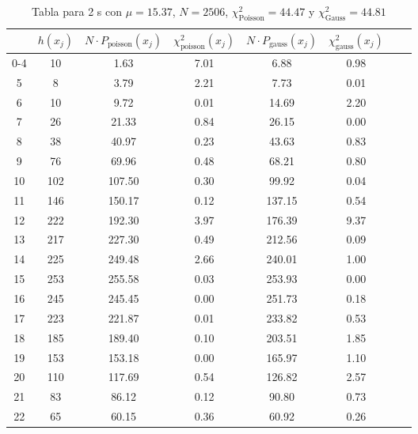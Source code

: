 \begin{center}
\begin{table}[H]
\caption{Tabla para 2 s con $\mu=15.37$, $N=2506$, $\chi^2_{\text{Poisson}}=44.47$  y $\chi^2_{\text{Gauss}}=44.81$}
\label{Tab:histo__2s}
\begin{tabular}{cccccccc}
\toprule
 & $h(x_j)$ & $N \cdot P_{\text{poisson}} (x_j)$ & $\chi^2_{\text{poisson}}(x_j)$ & $N \cdot P_{\text{gauss}} (x_j)$ & $\chi^2_{\text{gauss}}(x_j)$ \\
\midrule
0-4 & \num{   10} & \num{1.63} & \num{7.01} & \num{6.88} & \num{0.98} \\
5 & \num{    8} & \num{3.79} & \num{2.21} & \num{7.73} & \num{0.01} \\
6 & \num{   10} & \num{9.72} & \num{0.01} & \num{14.69} & \num{2.20} \\
7 & \num{   26} & \num{21.33} & \num{0.84} & \num{26.15} & \num{0.00} \\
8 & \num{   38} & \num{40.97} & \num{0.23} & \num{43.63} & \num{0.83} \\
9 & \num{   76} & \num{69.96} & \num{0.48} & \num{68.21} & \num{0.80} \\
10 & \num{  102} & \num{107.50} & \num{0.30} & \num{99.92} & \num{0.04} \\
11 & \num{  146} & \num{150.17} & \num{0.12} & \num{137.15} & \num{0.54} \\
12 & \num{  222} & \num{192.30} & \num{3.97} & \num{176.39} & \num{9.37} \\
13 & \num{  217} & \num{227.30} & \num{0.49} & \num{212.56} & \num{0.09} \\
14 & \num{  225} & \num{249.48} & \num{2.66} & \num{240.01} & \num{1.00} \\
15 & \num{  253} & \num{255.58} & \num{0.03} & \num{253.93} & \num{0.00} \\
16 & \num{  245} & \num{245.45} & \num{0.00} & \num{251.73} & \num{0.18} \\
17 & \num{  223} & \num{221.87} & \num{0.01} & \num{233.82} & \num{0.53} \\
18 & \num{  185} & \num{189.40} & \num{0.10} & \num{203.51} & \num{1.85} \\
19 & \num{  153} & \num{153.18} & \num{0.00} & \num{165.97} & \num{1.10} \\
20 & \num{  110} & \num{117.69} & \num{0.54} & \num{126.82} & \num{2.57} \\
21 & \num{   83} & \num{86.12} & \num{0.12} & \num{90.80} & \num{0.73} \\
22 & \num{   65} & \num{60.15} & \num{0.36} & \num{60.92} & \num{0.26} \\

\end{tabular}
\end{table}
\end{center}
